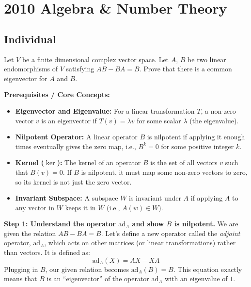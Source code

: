 \section{2010 Algebra \& Number Theory}

\subsection*{Individual}
\begin{exercise}
\label{algebra:2010:1}
Let $V$ be a finite dimensional complex vector space. Let $A$, $B$ be two linear endomorphisms of $V$ satisfying $AB - BA = B$. Prove that there is a common eigenvector for $A$ and $B$.
\end{exercise}

\begin{solution}
\textbf{Prerequisites / Core Concepts:}
\begin{itemize}
    \item \textbf{Eigenvector and Eigenvalue:} For a linear transformation $T$, a non-zero vector $v$ is an eigenvector if $T(v) = \lambda v$ for some scalar $\lambda$ (the eigenvalue).
    \item \textbf{Nilpotent Operator:} A linear operator $B$ is nilpotent if applying it enough times eventually gives the zero map, i.e., $B^k = 0$ for some positive integer $k$.
    \item \textbf{Kernel ($\ker$):} The kernel of an operator $B$ is the set of all vectors $v$ such that $B(v) = 0$. If $B$ is nilpotent, it must map some non-zero vectors to zero, so its kernel is not just the zero vector.
    \item \textbf{Invariant Subspace:} A subspace $W$ is invariant under $A$ if applying $A$ to any vector in $W$ keeps it in $W$ (i.e., $A(w) \in W$).
\end{itemize}

\textbf{Step 1: Understand the operator $\text{ad}_A$ and show $B$ is nilpotent.}
We are given the relation $AB - BA = B$. Let's define a new operator called the \textit{adjoint} operator, $\text{ad}_A$, which acts on other matrices (or linear transformations) rather than vectors. It is defined as:
\[ \text{ad}_A(X) = AX - XA \]
Plugging in $B$, our given relation becomes $\text{ad}_A(B) = B$. This equation exactly means that $B$ is an ``eigenvector'' of the operator $\text{ad}_A$ with an eigenvalue of $1$.


\end{solution}
